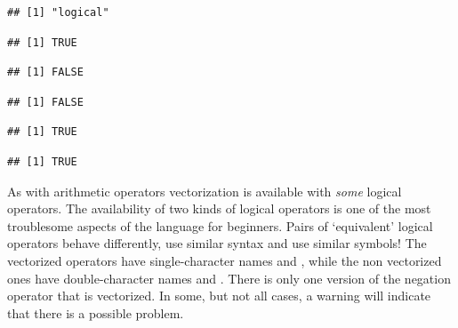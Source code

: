 \documentclass[krantz2]{krantz}\usepackage{knitr}%
\begin{document}
\begin{knitrout}\footnotesize
{}\color{fgcolor}\begin{kframe}
\begin{alltt}
 \hlkwb{<-} 
 \hlkwb{<-} 
\end{alltt}
\begin{verbatim}
## [1] "logical"
\end{verbatim}
\begin{alltt}
\end{alltt}
\begin{verbatim}
## [1] TRUE
\end{verbatim}
\begin{alltt}
\hlopt{!} 
\end{alltt}
\begin{verbatim}
## [1] FALSE
\end{verbatim}
\begin{alltt}
 \hlopt{&&}  
\end{alltt}
\begin{verbatim}
## [1] FALSE
\end{verbatim}
\begin{alltt}
 \hlopt{||}  
\end{alltt}
\begin{verbatim}
## [1] TRUE
\end{verbatim}
\begin{alltt}
 
\end{alltt}
\begin{verbatim}
## [1] TRUE
\end{verbatim}
\end{kframe}
\end{knitrout}

As with arithmetic operators vectorization is available with \emph{some} logical operators. The availability of two kinds of logical operators is one of the most troublesome aspects of the \Rlang language for beginners. Pairs of `equivalent' logical operators behave differently, use similar syntax and use similar symbols! The vectorized operators have single-character names \Roperator{\&} and \Roperator{\textbar}, while the non vectorized ones have double-character names \Roperator{\&\&} and \Roperator{\textbar\textbar}. There is only one version of the negation operator \Roperator{!} that is vectorized. In some, but not all cases, a warning will indicate that there is a possible problem.
\end{document}
